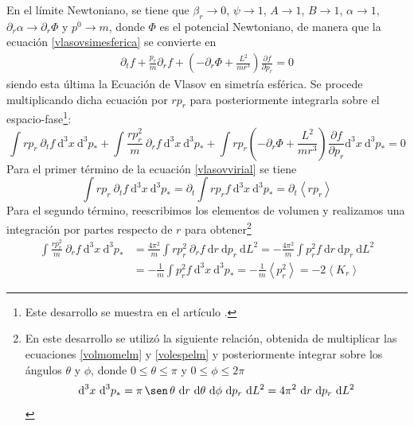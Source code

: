 \documentclass[11pt,twoside,openright,spanish]{report}
\numberwithin{equation}{chapter}
\numberwithin{figure}{chapter}
\numberwithin{table}{chapter}
\renewcommand{\sin}{\operatorname{\sen}}
\begin{document}
En el límite Newtoniano, se tiene que $\beta_r\rightarrow 0$, $\psi\rightarrow 1$, $A\rightarrow 1$, $B\rightarrow 1$, $\alpha\rightarrow 1$, $\partial_r\alpha\rightarrow\partial_r\Phi$ y $p^0\rightarrow m$, donde $\Phi$ es el potencial Newtoniano, de manera que la ecuación \eqref{vlasovsimesferica} se convierte en
\begin{eqnarray}
\partial_tf+\frac{p_r}{m}\partial_r f+\left(-\partial_r\Phi+\frac{L^2}{mr^3}\right)\frac{\partial f}{\partial p_r}=0
\end{eqnarray}
siendo esta última la Ecuación de Vlasov en simetría esférica. Se procede multiplicando dicha ecuación por $rp_r$ para posteriormente integrarla sobre el espacio-fase\footnote{Este desarrollo se muestra en el artículo \citet{Dominguez2017}.}:
\begin{equation}
\int rp_r\ \partial_t f\ \text{d}^3x\ \text{d}^3p_*+\int \frac{rp_r^2}{m}\ \partial_rf\ \text{d}^3x\ \text{d}^3p_*+\int rp_r\left(-\partial_r\Phi+\frac{L^2}{mr^3}\right)\frac{\partial f}{\partial p_r} \text{d}^3x\ \text{d}^3p_*=0
\label{vlasovvirial}
\end{equation}
Para el primer término de la ecuación \eqref{vlasovvirial} se tiene
\begin{equation}
\int rp_r\ \partial_t f\ \text{d}^3x\ \text{d}^3p_*=\partial_t\int rp_rf\ \text{d}^3x\ \text{d}^3p_*=\partial_t\left<rp_r\right>
\label{rpvir}
\end{equation}
Para el segundo término, reescribimos los elementos de volumen y realizamos una integración por partes respecto de $r$ para obtener\footnote{En este desarrollo se utilizó la siguiente relación, obtenida de multiplicar las ecuaciones \eqref{volmomelm} y \eqref{volespelm} y posteriormente integrar sobre los ángulos $\theta$ y $\phi$, donde $0\leq\theta\leq\pi$ y $0\leq\phi\leq 2\pi$ 
	\begin{equation}
	\nonumber
	\text{d}^3x\ \text{d}^3p_*=\pi \sin\theta\ \text{d}r\ \text{d}\theta\ \text{d}\phi\ \text{d}p_r\ \text{d}L^2=4\pi^2\ \text{d}r\ \text{d}p_r\ \text{d}L^2
	\label{elemvolmod}
	\end{equation}
	} 
\begin{align}
\nonumber
\int \frac{rp_r^2}{m}\ \partial_rf\ \text{d}^3x\ \text{d}^3p_*&=\frac{4\pi^2}{m}\int rp_r^2\ \partial_rf\  \text{d}r\ \text{d}p_r\ \text{d}L^2=-\frac{4\pi^2}{m}\int p_r^2f\ \text{d}r\ \text{d}p_r\ \text{d}L^2\\
&=-\frac{1}{m}\int p_r^2f\ \text{d}^3x\ \text{d}^3p_*=-\frac{1}{m}\left<p_r^2\right>=-2\left<K_r\right>
\label{cinvir}
\end{align}
\end{document}
